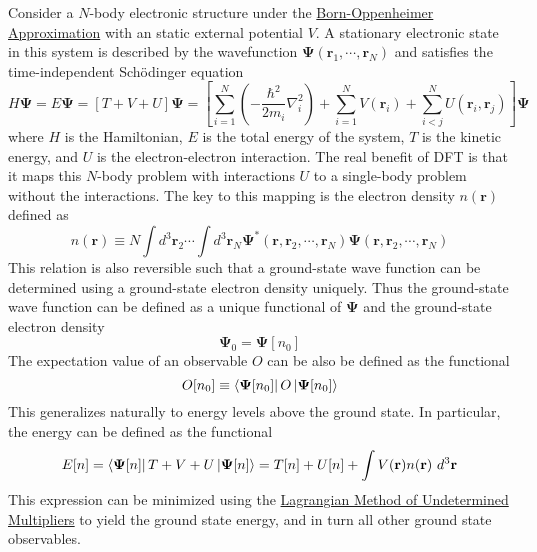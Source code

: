 \documentclass[12pt]{article}
\newcommand{\lrp}[1]{\left( #1 \right)}
\newcommand{\lrb}[1]{\left[ #1 \right]}
\begin{document}
Consider a $N$-body electronic structure under the \href{https://en.wikipedia.org/wiki/Born\%E2\%80\%93Oppenheimer_approximation}{Born-Oppenheimer Approximation} with an static external potential $V$. A stationary electronic state in this system is described by the wavefunction $\boldsymbol{\Psi}(\textbf{r}_1,\cdots,\textbf{r}_N)$ and satisfies the time-independent Sch\"odinger equation
\begin{equation*}
    H\boldsymbol{\Psi} = E\boldsymbol{\Psi} = \lrb{T+V+U}\boldsymbol{\Psi} = \lrb{\sum_{i=1}^N \lrp{-\frac{\hbar^2}{2m_i}\nabla_i^2}+\sum_{i=1}^N V(\textbf{r}_i) + \sum_{i<j}^N U(\textbf{r}_i,\textbf{r}_j)}\boldsymbol{\Psi} 
\end{equation*}
where $H$ is the Hamiltonian, $E$ is the total energy of the system, $T$ is the kinetic energy, and $U$ is the electron-electron interaction. The real benefit of DFT is that it maps this $N$-body problem with interactions $U$ to a single-body problem without the interactions. The key to this mapping is the electron density $n(\textbf{r})$ defined as
\begin{equation*}
    n(\textbf{r}) \equiv N\int d^3\textbf{r}_2 \cdots \int d^3\textbf{r}_N \boldsymbol{\Psi}^*(\textbf{r},\textbf{r}_2,\cdots,\textbf{r}_N)\boldsymbol{\Psi}(\textbf{r},\textbf{r}_2,\cdots,\textbf{r}_N)
\end{equation*}
This relation is also reversible such that a ground-state wave function can be determined using a ground-state electron density uniquely. Thus the ground-state wave function can be defined as a unique functional of $\boldsymbol{\Psi}$ and the ground-state electron density \cite{HKt1}
\begin{equation*}
    \boldsymbol{\Psi}_0 = \boldsymbol{\Psi}[n_0]
\end{equation*}
The expectation value of an observable $O$ can be also be defined as the functional
\begin{equation*}
    O[n_0] \equiv \bra{\boldsymbol{\Psi}[n_0]}O\ket{\boldsymbol{\Psi}[n_0]}
\end{equation*}
This generalizes naturally to energy levels above the ground state. In particular, the energy can be defined as the functional
\begin{equation}\label{eq:Enfunc}
    E[n] = \bra{\boldsymbol{\Psi}[n]}T+V+U\ket{\boldsymbol{\Psi}[n]} = T[n] + U[n] + \int V(\textbf{r})n(\textbf{r})~d^3\textbf{r}
\end{equation}
This expression can be minimized using the \href{https://en.wikipedia.org/wiki/Lagrange_multiplier}{Lagrangian Method of Undetermined Multipliers} to yield the ground state energy, and in turn all other ground state observables.
\end{document}
